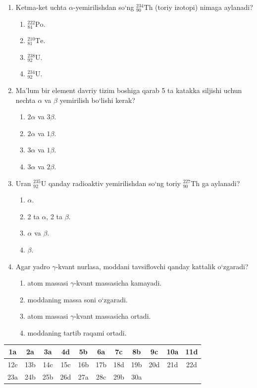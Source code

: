 \begin{enumerate}
\item Ketma-ket uchta $\alpha$-yemirilishdan so‘ng $^{234}_{90}\text{Th}$ (toriy izotopi) nimaga aylanadi?
\begin{enumerate}[label=\Alph*)]
\item $^{222}_{84}\text{Po}$.
\item $^{210}_{81}\text{Te}$.
\item $^{238}_{92}\text{U}$.
\item $^{234}_{92}\text{U}$.
\end{enumerate}

\item Ma’lum bir element davriy tizim boshiga qarab 5 ta katakka siljishi uchun nechta $\alpha$ va $\beta$ yemirilish bo‘lishi kerak?
\begin{enumerate}[label=\Alph*)]
\item $2\alpha$ va $3\beta$.
\item $2\alpha$ va $1\beta$.
\item $3\alpha$ va $1\beta$.
\item $3\alpha$ va $2\beta$.
\end{enumerate}

\item Uran $^{235}_{92}\text{U}$ qanday radioaktiv yemirilishdan so‘ng toriy $^{227}_{90}\text{Th}$ ga aylanadi?
\begin{enumerate}[label=\Alph*)]
\item $\alpha$.
\item 2 ta $\alpha$, 2 ta $\beta$.
\item $\alpha$ va $\beta$.
\item $\beta$.
\end{enumerate}

\item Agar yadro $\gamma$-kvant nurlasa, moddani tavsiflovchi qanday kattalik o‘zgaradi?
\begin{enumerate}[label=\Alph*)]
\item atom massasi $\gamma$-kvant massasicha kamayadi.
\item moddaning massa soni o‘zgaradi.
\item atom massasi $\gamma$-kvant massasicha ortadi.
\item moddaning tartib raqami ortadi.
\end{enumerate}

\end{enumerate}



\begin{table}[!ht]
\centering
\begin{tabular}{|c|c|c|c|c|c|c|c|c|c|c|}
\hline
1a & 2a & 3a & 4d & 5b & 6a & 7c & 8b & 9c & 10a & 11d \\ \hline
12c & 13b & 14c & 15c & 16b & 17b & 18d & 19b & 20d & 21d & 22d \\ \hline
23a & 24b & 25b & 26d & 27a & 28c & 29b & 30a & & & \\ \hline
\end{tabular}
\end{table}